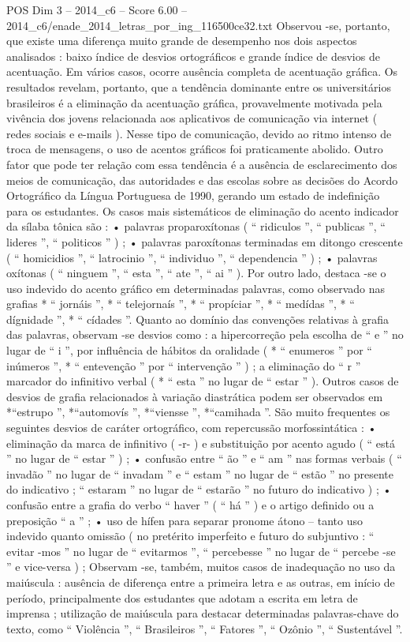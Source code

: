 \begin{textsample}{POS Dim 3 – 2014\_c6 – Score 6.00 – 2014\_c6/enade\_2014\_letras\_por\_ing\_116500ce32.txt}
Observou -se, portanto, que existe uma diferença muito grande de desempenho nos dois aspectos analisados : baixo índice de desvios ortográficos e grande índice de desvios de acentuação.
Em vários casos, ocorre ausência completa de acentuação gráfica.
Os resultados revelam, portanto, que a tendência dominante entre os universitários brasileiros é a eliminação da acentuação gráfica, provavelmente motivada pela vivência dos jovens relacionada aos aplicativos de comunicação via internet ( redes sociais e e-mails ).
Nesse tipo de comunicação, devido ao ritmo intenso de troca de mensagens, o uso de acentos gráficos foi praticamente abolido.
Outro fator que pode ter relação com essa tendência é a ausência de esclarecimento dos meios de comunicação, das autoridades e das escolas sobre as decisões do Acordo Ortográfico da Língua Portuguesa de 1990, gerando um estado de indefinição para os estudantes.
Os casos mais sistemáticos de eliminação do acento indicador da sílaba tônica são : • palavras proparoxítonas ( “ ridiculos ”, “ publicas ”, “ lideres ”, “ politicos ” ) ; • palavras paroxítonas terminadas em ditongo crescente ( “ homicidios ”, “ latrocinio ”, “ individuo ”, “ dependencia ” ) ; • palavras oxítonas ( “ ninguem ”, “ esta ”, “ ate ”, “ ai ” ).
Por outro lado, destaca -se o uso indevido do acento gráfico em determinadas palavras, como observado nas grafias * “ jornáis ”, * “ telejornaís ”, * “ propíciar ”, * “ medídas ”, * “ dígnidade ”, * “ cídades ”.
Quanto ao domínio das convenções relativas à grafia das palavras, observam -se desvios como : a hipercorreção pela escolha de “ e ” no lugar de “ i ”, por influência de hábitos da oralidade ( * “ enumeros ” por “ inúmeros ”, * “ entevenção ” por “ intervenção ” ) ; a eliminação do “ r ” marcador do infinitivo verbal ( * “ esta ” no lugar de “ estar ” ).
Outros casos de desvios de grafia relacionados à variação diastrática podem ser observados em *“estrupo ”, *“automovís ”, *“viensse ”, *“camihada ”.
São muito frequentes os seguintes desvios de caráter ortográfico, com repercussão morfossintática : • eliminação da marca de infinitivo ( -r- ) e substituição por acento agudo ( “ está ” no lugar de “ estar ” ) ; • confusão entre “ ão ” e “ am ” nas formas verbais ( “ invadão ” no lugar de “ invadam ” e “ estam ” no lugar de “ estão ” no presente do indicativo ; “ estaram ” no lugar de “ estarão ” no futuro do indicativo ) ; • confusão entre a grafia do verbo “ haver ” ( “ há ” ) e o artigo definido ou a preposição “ a ” ; • uso de hífen para separar pronome átono – tanto uso indevido quanto omissão ( no pretérito imperfeito e futuro do subjuntivo : “ evitar -mos ” no lugar de “ evitarmos ”, “ percebesse ” no lugar de “ percebe -se ” e vice-versa ) ; Observam -se, também, muitos casos de inadequação no uso da maiúscula : ausência de diferença entre a primeira letra e as outras, em início de período, principalmente dos estudantes que adotam a escrita em letra de imprensa ; utilização de maiúscula para destacar determinadas palavras-chave do texto, como “ Violência ”, “ Brasileiros ”, “ Fatores ”, “ Ozônio ”, “ Sustentável ”.

\end{textsample}
